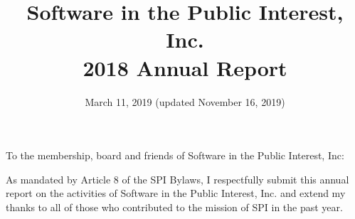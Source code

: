 \documentclass[a4paper]{report}
\begin{document}
\title{Software in the Public Interest, Inc.\\
2018 Annual Report}
\date{March 11, 2019 (updated November 16, 2019)}

\maketitle

\newpage


\hspace{1em}

To the membership, board and friends of Software in the Public Interest, Inc:

As mandated by Article 8 of the SPI Bylaws, I respectfully submit this annual
report on the activities of Software in the Public Interest, Inc. and extend my
thanks to all of those who contributed to the mission of SPI in the past year.
\end{document}
